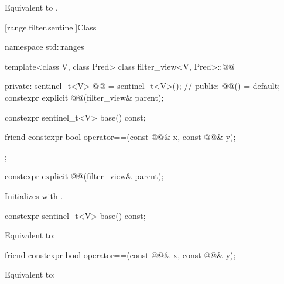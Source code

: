 \begin{itemdescr}
\pnum
\effects
Equivalent to .
\end{itemdescr}

[range.filter.sentinel]{Class }

%
\begin{codeblock}
namespace std::ranges {
  template<class V, class Pred>
  class filter_view<V, Pred>::@@ {
  private:
    sentinel_t<V> @@ = sentinel_t<V>();       // \expos
  public:
    @@() = default;
    constexpr explicit @@(filter_view& parent);

    constexpr sentinel_t<V> base() const;

    friend constexpr bool operator==(const @@& x, const @@& y);
  };
}
\end{codeblock}

%
\begin{itemdecl}
constexpr explicit @@(filter_view& parent);
\end{itemdecl}

\begin{itemdescr}
\pnum
\effects
Initializes  with .
\end{itemdescr}

%
\begin{itemdecl}
constexpr sentinel_t<V> base() const;
\end{itemdecl}

\begin{itemdescr}
\pnum
\effects
Equivalent to: 
\end{itemdescr}

%
\begin{itemdecl}
friend constexpr bool operator==(const @@& x, const @@& y);
\end{itemdecl}

\begin{itemdescr}
\pnum
\effects
Equivalent to: 
\end{itemdescr}


